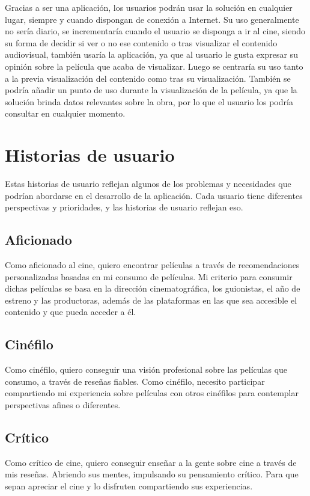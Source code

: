 Gracias a ser una aplicación, los usuarios podrán usar la solución en cualquier lugar, siempre y 
cuando dispongan de conexión a Internet. Su uso generalmente no sería diario, se incrementaría cuando 
el usuario se disponga a ir al cine, siendo su forma de decidir si ver o no ese 
contenido o tras visualizar el contenido audiovisual, también usaría la aplicación, ya que al usuario le 
gusta expresar su opinión sobre la película que acaba de visualizar. Luego se centraría su 
uso tanto a la previa visualización del contenido como tras su visualización. También se podría añadir 
un punto de uso durante la visualización de la película, ya que la solución brinda datos 
relevantes sobre la obra, por lo que el usuario los podría consultar en cualquier momento.


\section{Historias de usuario}

Estas historias de usuario reflejan algunos de los problemas y necesidades que podrían abordarse en el desarrollo de la aplicación. Cada usuario tiene diferentes perspectivas y prioridades, y las historias de usuario reflejan eso.

\subsection{Aficionado}

Como aficionado al cine, quiero encontrar películas a través de recomendaciones personalizadas basadas en mi consumo de películas. Mi criterio para consumir dichas películas se basa en la dirección cinematográfica, los guionistas, el año de estreno y las productoras, además de las plataformas en las que sea accesible el contenido y que pueda acceder a él.

\subsection{Cinéfilo}

Como cinéfilo, quiero conseguir una visión profesional sobre las películas que consumo, a través de reseñas fiables. Como cinéfilo, necesito participar compartiendo mi experiencia sobre películas con otros cinéfilos para contemplar perspectivas afines o diferentes. 

\subsection{Crítico}

Como crítico de cine, quiero conseguir enseñar a la gente sobre cine a través de mis reseñas. Abriendo sus mentes, impulsando su pensamiento crítico. Para que sepan apreciar el cine y lo disfruten compartiendo sus experiencias.

